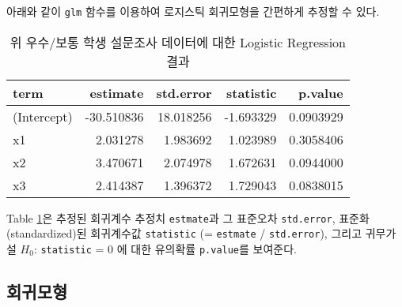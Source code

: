 \documentclass[]{book}
\newenvironment{Shaded}{\begin{snugshade}}{\end{snugshade}}
\newcommand{\CommentTok}[1]{\textcolor[rgb]{0.56,0.35,0.01}{\textit{#1}}}
\newcommand{\DataTypeTok}[1]{\textcolor[rgb]{0.13,0.29,0.53}{#1}}
\newcommand{\KeywordTok}[1]{\textcolor[rgb]{0.13,0.29,0.53}{\textbf{#1}}}
\newcommand{\NormalTok}[1]{#1}
\newcommand{\OperatorTok}[1]{\textcolor[rgb]{0.81,0.36,0.00}{\textbf{#1}}}
\newcommand{\OtherTok}[1]{\textcolor[rgb]{0.56,0.35,0.01}{#1}}
\newcommand{\StringTok}[1]{\textcolor[rgb]{0.31,0.60,0.02}{#1}}
\begin{document}
아래와 같이 \texttt{glm} 함수를 이용하여 로지스틱 회귀모형을 간편하게 추정할 수 있다.

\begin{Shaded}
\end{Shaded}

\begin{table}[t]

\caption{\label{tab:binary-logistic-reg-coef}위 우수/보통 학생 설문조사 데이터에 대한 Logistic Regression 결과}
\centering
\begin{tabular}{lrrrr}
\toprule
term & estimate & std.error & statistic & p.value\\
\midrule
(Intercept) & -30.510836 & 18.018256 & -1.693329 & 0.0903929\\
x1 & 2.031278 & 1.983692 & 1.023989 & 0.3058406\\
x2 & 3.470671 & 2.074978 & 1.672631 & 0.0944000\\
x3 & 2.414387 & 1.396372 & 1.729043 & 0.0838015\\
\bottomrule
\end{tabular}
\end{table}

Table \ref{tab:binary-logistic-reg-coef}은 추정된 회귀계수 추정치 \texttt{estmate}과 그 표준오차 \texttt{std.error}, 표준화(standardized)된 회귀계수값 \texttt{statistic} (= \texttt{estmate} / \texttt{std.error}), 그리고 귀무가설 \(H_0\): \texttt{statistic} = 0 에 대한 유의확률 \texttt{p.value}를 보여준다.

\hypertarget{binary-logistic-reg-model}{%
\subsection{회귀모형}\label{binary-logistic-reg-model}}
\end{document}
